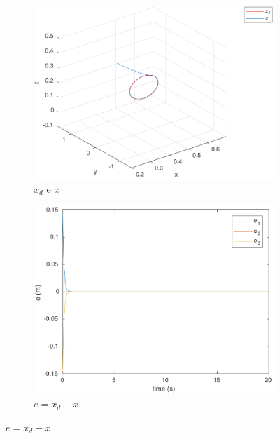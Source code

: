 \documentclass[a4paper,11pt]{article}
\theoremstyle{mytheor}
\begin{document}
\begin{figure}[!ht]
\centering
  \begin{minipage}{\linewidth}
  \centering
    \begin{subfigure}[b]{1\textwidth}
    \includegraphics[width=1\textwidth]{figs/ex1_b_1_x.pdf}
    \caption{$x_d$ e $x$}
    \label{fig:ex1_b_1_x}
    \end{subfigure}
  \end{minipage}
  \begin{minipage}{\linewidth}
  \centering
    \begin{subfigure}[b]{0.45\textwidth}
    \includegraphics[width=1\textwidth]{figs/ex1_b_1_e.pdf}
    \caption{$e = x_d - x$}
    \label{fig:ex1_b_1_e}

\end{subfigure}
\end{minipage}
\end{figure}
\end{document}
